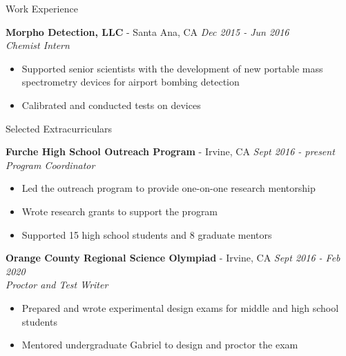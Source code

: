 \documentclass{resume} %
\begin{document}
\begin{rSection}{Work Experience}

  {\bf Morpho Detection, LLC} - Santa Ana, CA \hfill {\em Dec 2015 - Jun 2016}  \\
  {\textit{Chemist Intern}}
  \vspace{-0.5em}
  \begin{itemize}
  \itemsep-0.75em
  \item Supported senior scientists with the development of new portable mass
    spectrometry devices for airport bombing detection
  \item Calibrated and conducted tests on devices
  \end{itemize}  

\end{rSection}


\begin{rSection}{Selected Extracurriculars}

  {\bf Furche High School Outreach Program} - Irvine, CA \hfill {\em Sept 2016 - present} \\
  {\textit{Program Coordinator}}
  \vspace{-0.5em}
  \begin{itemize}
  \itemsep-0.75em
  \item Led the outreach program to provide one-on-one research mentorship
  \item Wrote research grants to support the program  %
  \item Supported 15 high school students and 8 graduate mentors
  \end{itemize}

  {\bf Orange County Regional Science Olympiad} - Irvine, CA \hfill {\em Sept 2016 - Feb 2020}  \\
  {\textit{Proctor and Test Writer}}
  \vspace{-0.5em}
  \begin{itemize}
  \itemsep-0.75em
  \item Prepared and wrote experimental design exams for middle and high school students
  \item Mentored undergraduate Gabriel to design and proctor the exam
  \end{itemize}

\end{rSection}
\end{document}
